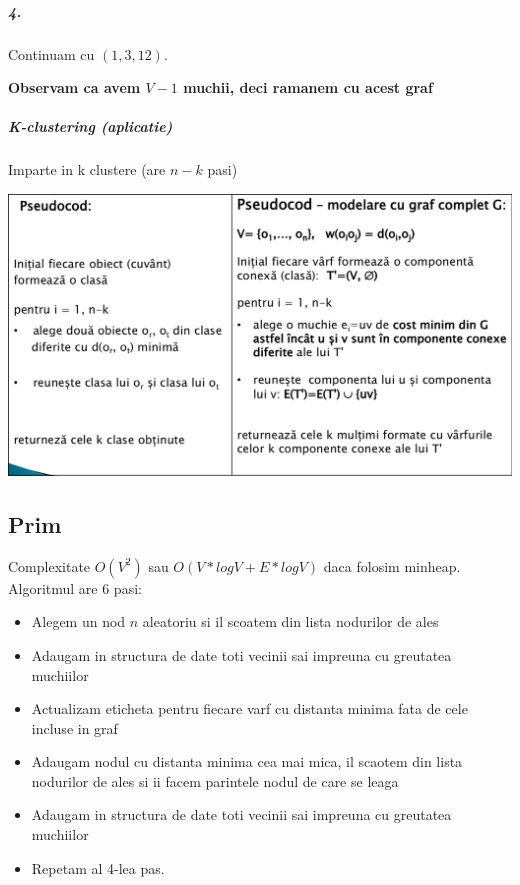 \documentclass{article}
\begin{document}
    \subparagraph*{4.} Continuam cu $(1,3,12)$.
    
    \begin{center}
    \end{center}

    \begin{center}
        \textbf{Observam ca avem $V-1$ muchii, deci ramanem cu acest graf}
    \end{center}
    
    \subparagraph*{K-clustering (aplicatie)} Imparte in k clustere (are $n-k$ pasi)
    \begin{center}
        \includegraphics[scale=0.3]{1_kclustering.png}
    \end{center}

    \subsection*{Prim} Complexitate $O(V^2)$ sau $O(V*logV + E*logV)$ daca folosim minheap. Algoritmul are 6 pasi:
    \begin{itemize}
        \item Alegem un nod $n$ aleatoriu si il scoatem din lista nodurilor de ales
        \item Adaugam in structura de date toti vecinii sai impreuna cu greutatea muchiilor
        \item Actualizam eticheta pentru fiecare varf cu distanta minima fata de cele incluse in graf
        \item Adaugam nodul cu distanta minima cea mai mica, il scaotem din lista nodurilor de ales si ii facem parintele nodul de care se leaga
        \item Adaugam in structura de date toti vecinii sai impreuna cu greutatea muchiilor
        \item Repetam al 4-lea pas.
    \end{itemize}
\end{document}
